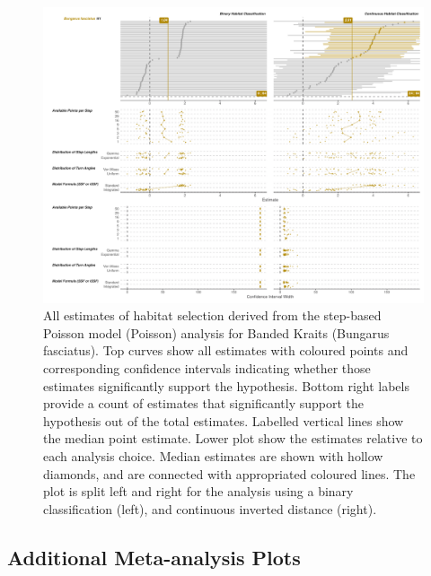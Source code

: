 \documentclass[10pt,a4paper]{article}
\begin{document}
\begin{figure}
\includegraphics[width=1\linewidth]{../../figures/specCurve_Bungarus fasciatus_pois} \caption{All estimates of habitat selection derived from the step-based Poisson model (Poisson) analysis for Banded Kraits (Bungarus fasciatus). Top curves show all estimates with coloured points and corresponding confidence intervals indicating whether those estimates significantly support the hypothesis. Bottom right labels provide a count of estimates that significantly support the hypothesis out of the total estimates. Labelled vertical lines show the median point estimate. Lower plot show the estimates relative to each analysis choice. Median estimates are shown with hollow diamonds, and are connected with appropriated coloured lines. The plot is split left and right for the analysis using a binary classification (left), and continuous inverted distance (right).}\label{fig:specCurvePoisBUFA}
\end{figure}

\subsection{Additional Meta-analysis Plots}\label{additional-meta-analysis-plots}
\end{document}
